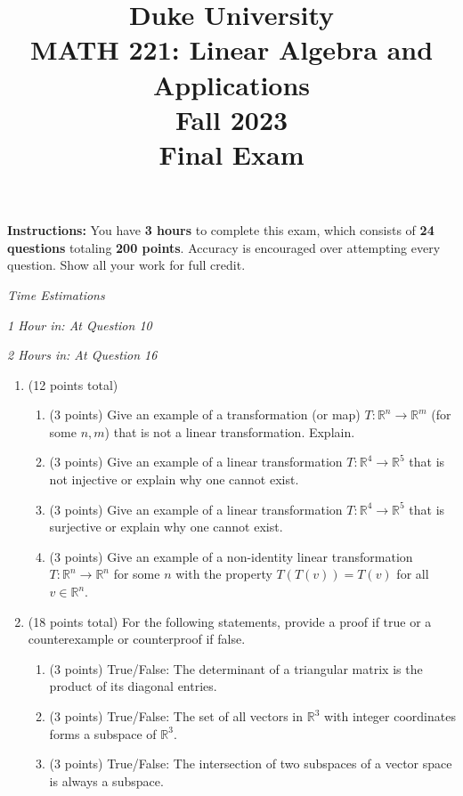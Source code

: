 \documentclass[12pt]{article}
\title{
    \vspace{4cm}
    \textbf{\LARGE Duke University} \\
    \vspace{0.5cm}
    \textbf{\Large MATH 221: Linear Algebra and Applications} \\
    \vspace{0.5cm}
    \textbf{Fall 2023} \\
    \vspace{0.5cm}
    \textbf{\Large Final Exam} \\
    \vspace{0.5cm}
}
\date{}
\begin{document}
\maketitle

\textbf{Instructions:} You have \textbf{3 hours} to complete this exam, which consists of \textbf{24 questions} totaling \textbf{200 points}. Accuracy is encouraged over attempting every question. Show all your work for full credit. 

\textit{Time Estimations}

\textit{1 Hour in: At Question 10}

\textit{2 Hours in: At Question 16}

\newpage


\begin{enumerate}

    \item (12 points total)
    \begin{enumerate}
    \item (3 points) Give an example of a transformation (or map) \( T: \mathbb{R}^n \to \mathbb{R}^m \) (for some \( n, m \)) that is not a linear transformation. Explain.
    \item (3 points) Give an example of a linear transformation \( T: \mathbb{R}^4 \to \mathbb{R}^5 \) that is not injective or explain why one cannot exist.
    \item (3 points) Give an example of a linear transformation \( T: \mathbb{R}^4 \to \mathbb{R}^5 \) that is surjective or explain why one cannot exist.
    \item (3 points) Give an example of a non-identity linear transformation \( T: \mathbb{R}^n \to \mathbb{R}^n \) for some $n$ with the property $T(T(v)) = T(v)$ for all $v \in \mathbb{R}^n$.
    \end{enumerate}
    
    \item (18 points total) For the following statements, provide a proof if true or a counterexample or counterproof if false.
    \begin{enumerate}
        \item (3 points) True/False: The determinant of a triangular matrix is the product of its diagonal entries.

        \item (3 points) True/False: The set of all vectors in \( \mathbb{R}^3 \) with integer coordinates forms a subspace of \( \mathbb{R}^3 \).
        
        \item (3 points) True/False: The intersection of two subspaces of a vector space is always a subspace.
        

\end{enumerate}
\end{enumerate}
\end{document}
